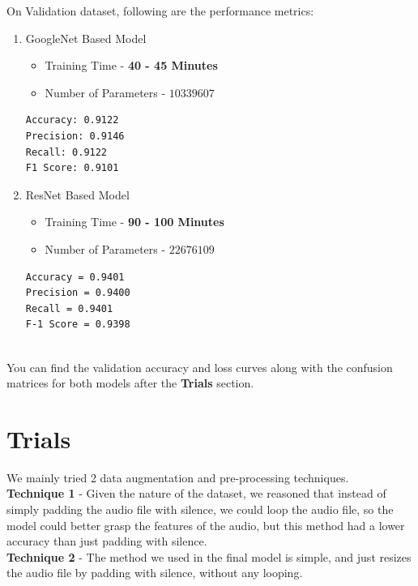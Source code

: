 \documentclass{article}
\begin{document}
On Validation dataset, following are the performance metrics:
\begin{enumerate}
\item GoogleNet Based Model

\begin{itemize}

\item
Training Time - \textbf{40 - 45 Minutes}
\item 
Number of Parameters - $10339607$

\end{itemize}
\begin{lstlisting}
Accuracy: 0.9122
Precision: 0.9146
Recall: 0.9122
F1 Score: 0.9101
\end{lstlisting}

\item ResNet Based Model

\begin{itemize}
\item
Training Time - \textbf{90 - 100 Minutes}
\item
Number of Parameters - $22676109$
\end{itemize}
\begin{lstlisting}
Accuracy = 0.9401
Precision = 0.9400
Recall = 0.9401
F-1 Score = 0.9398
\end{lstlisting}
\end{enumerate}
\\
You can find the validation accuracy and loss curves along with the confusion matrices for both models after the \textbf{Trials} section.

\section{Trials}

We mainly tried 2 data augmentation and pre-processing techniques.\\

\textbf{Technique 1} - Given the nature of the dataset, we reasoned that instead of simply padding the audio file with silence, we could loop the audio file, so the model could better grasp the features of the audio, but this method had a lower accuracy than just padding with silence.\\

\textbf{Technique 2} - The method we used in the final model is simple, and just resizes the audio file by padding with silence, without any looping.\\
\end{document}
